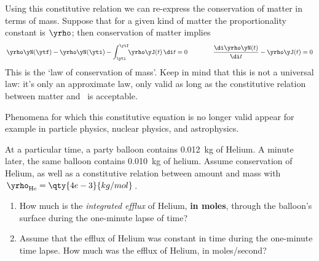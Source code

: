 \smallskip

Using this constitutive relation we can re-express the conservation of matter in terms of mass. Suppose that for a given kind of matter the proportionality constant is $\yrho$; then conservation of matter implies
\begin{equation*}
  \begin{gathered}
    \yrho\yN(\ytf) - \yrho\yN(\yti) - \int_{\yti}^{\ytf}\!\!\yrho\yJ(t)\,\di t = 0
    \qquad%
    \qquad
    \frac{\di\yrho\yN(t)}{\di t} - \yrho\yJ(t) = 0
  \end{gathered}
\end{equation*}
This is the \enquote*{law of conservation of mass}. Keep in mind that this is not a universal law: it's only an approximate law, only valid as long as the constitutive relation between matter and \masse\ is acceptable.

Phenomena for which this constitutive equation is no longer valid appear for example in particle physics, nuclear physics, and astrophysics.

\begin{exercise}
  At a particular time, a party balloon contains \qty{0.012}{kg} of Helium. A minute later, the same balloon contains \qty{0.010}{kg} of helium. Assume conservation of Helium, as well as a constitutive relation between amount and mass with  $\yrho_{\mathrm{He}} = \qty{4e-3}{kg/mol}$.
  \begin{enumerate}[exerc]
  \item How much is the \emph{integrated efflux} of Helium, \textbf{in moles}, through the balloon's surface during the one-minute lapse of time?
  \item Assume that the efflux of Helium was constant in time during the one-minute time lapse. How much was the efflux of Helium, in moles/second?
  \end{enumerate}
\end{exercise}



